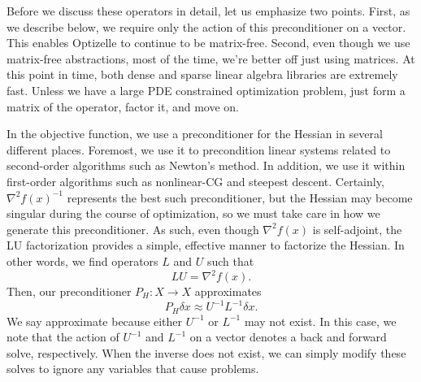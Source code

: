 \documentclass{report}
\begin{document}
        Before we discuss these operators in detail, let us emphasize two points.  First, as we describe below, we require only the action of this preconditioner on a vector.  This enables Optizelle to continue to be matrix-free.  Second, even though we use matrix-free abstractions, most of the time, we're better off just using matrices.  At this point in time, both dense and sparse linear algebra libraries are extremely fast.  Unless we have a large PDE constrained optimization problem, just form a matrix of the operator, factor it, and move on.
        
        In the objective function, we use a preconditioner for the Hessian in several different places.  Foremost, we use it to precondition linear systems related to second-order algorithms such as Newton's method.  In addition, we use it within first-order algorithms such as nonlinear-CG and steepest descent.  Certainly, $\nabla^2 f(x)^{-1}$ represents the best such preconditioner, but the Hessian may become singular during the course of optimization, so we must take care in how we generate this preconditioner.  As such, even though $\nabla^2 f(x)$ is self-adjoint, the LU factorization provides a simple, effective manner to factorize the Hessian.  In other words, we find operators $L$ and $U$ such that
$$
        LU=\nabla^2 f(x).
$$
Then, our preconditioner $P_H:X\rightarrow X$ approximates 
$$
        P_H\delta x \approx U^{-1}L^{-1} \delta x.
$$
We say approximate because either $U^{-1}$ or $L^{-1}$ may not exist.  In this case, we note that the action of $U^{-1}$ and $L^{-1}$ on a vector denotes a back and forward solve, respectively.  When the inverse does not exist, we can simply modify these solves to ignore any variables that cause problems.
\end{document}
